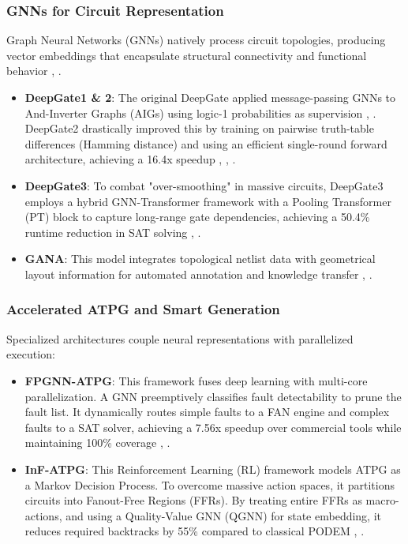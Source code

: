 \documentclass[conference]{IEEEtran}
\begin{document}
\subsubsection{GNNs for Circuit Representation}
Graph Neural Networks (GNNs) natively process circuit topologies, producing vector embeddings that encapsulate structural connectivity and functional behavior \cite{deepgate3-arxiv}, \cite{deepgate2-arxiv}.
\begin{itemize}
   \item \textbf{DeepGate1 \& 2}: The original DeepGate applied message-passing GNNs to And-Inverter Graphs (AIGs) using logic-1 probabilities as supervision \cite{deepgate3-arxiv}, \cite{deepgate2-arxiv}. DeepGate2 drastically improved this by training on pairwise truth-table differences (Hamming distance) and using an efficient single-round forward architecture, achieving a 16.4x speedup \cite{deepgate2-arxiv}, \cite{huang2021machine}, \cite{deepgate2-xplore}.
   \item \textbf{DeepGate3}: To combat "over-smoothing" in massive circuits, DeepGate3 employs a hybrid GNN-Transformer framework with a Pooling Transformer (PT) block to capture long-range gate dependencies, achieving a 50.4\% runtime reduction in SAT solving \cite{deepgate3-arxiv}, \cite{huang2021machine}.
   \item \textbf{GANA}: This model integrates topological netlist data with geometrical layout information for automated annotation and knowledge transfer \cite{huang2021machine}, \cite{gana-date}.
\end{itemize}

\subsubsection{Accelerated ATPG and Smart Generation}
Specialized architectures couple neural representations with parallelized execution:
\begin{itemize}
   \item \textbf{FPGNN-ATPG}: This framework fuses deep learning with multi-core parallelization. A GNN preemptively classifies fault detectability to prune the fault list. It dynamically routes simple faults to a FAN engine and complex faults to a SAT solver, achieving a 7.56x speedup over commercial tools while maintaining 100\% coverage \cite{huang2021machine}, \cite{fpgnn-atpg-ss}.
   \item \textbf{InF-ATPG}: This Reinforcement Learning (RL) framework models ATPG as a Markov Decision Process. To overcome massive action spaces, it partitions circuits into Fanout-Free Regions (FFRs). By treating entire FFRs as macro-actions, and using a Quality-Value GNN (QGNN) for state embedding, it reduces required backtracks by 55\% compared to classical PODEM \cite{inf-atpg-rl}, \cite{huang2021machine}.
\end{itemize}
\end{document}
